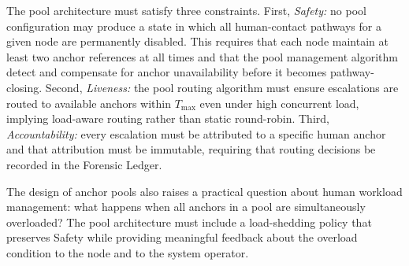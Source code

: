 The pool architecture must satisfy three constraints. First, \textit{Safety:} no pool configuration may produce a state in which all human-contact pathways for a given node are permanently disabled. This requires that each node maintain at least two anchor references at all times and that the pool management algorithm detect and compensate for anchor unavailability before it becomes pathway-closing. Second, \textit{Liveness:} the pool routing algorithm must ensure escalations are routed to available anchors within $T_{\max}$ even under high concurrent load, implying load-aware routing rather than static round-robin. Third, \textit{Accountability:} every escalation must be attributed to a specific human anchor and that attribution must be immutable, requiring that routing decisions be recorded in the Forensic Ledger.

The design of anchor pools also raises a practical question about human workload management: what happens when all anchors in a pool are simultaneously overloaded? The pool architecture must include a load-shedding policy that preserves Safety while providing meaningful feedback about the overload condition to the node and to the system operator.
